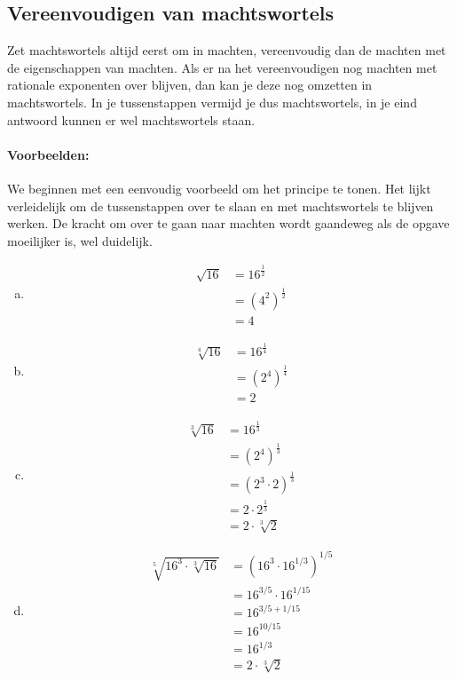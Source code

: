 \documentclass[12pt,twoside]{article}
\begin{document}
\subsection{Vereenvoudigen van machtswortels}

Zet machtswortels altijd eerst om in machten, vereenvoudig dan de machten met de eigenschappen van machten. Als er na het vereenvoudigen nog machten met rationale exponenten over blijven, dan kan je deze nog omzetten in machtswortels. In je tussenstappen vermijd je dus machtswortels, in je eind antwoord kunnen er wel machtswortels staan.

\paragraph*{Voorbeelden:} We beginnen met een eenvoudig voorbeeld om het principe te tonen. Het lijkt verleidelijk om de tussenstappen over te slaan en met machtswortels te blijven werken. De kracht om over te gaan naar machten wordt gaandeweg als de opgave moeilijker is, wel duidelijk.
\begin{enumerate}[(a)]
\item \mbox{}\vspace{-2em}
  \begin{align*}
    \sqrt {16} &= {16^{\frac{1}{2}}}\\
               &= \left(4^2\right)^{\frac{1}{2}}\\
               &= 4
  \end{align*}
\item \mbox{}\vspace{-2em}
  \begin{align*}
    \sqrt[4]{16} &= {16^{\frac{1}{4}}}\\
               &= \left(2^4\right)^{\frac{1}{4}}\\
               &= 2
  \end{align*}
\item \mbox{}\vspace{-2em}
  \begin{align*}
    \sqrt[3] {16} &= {16^{\frac{1}{3}}}\\
               &= \left(2^4\right)^{\frac{1}{3}}\\
               &= \left(2^3\cdot 2\right)^{\frac{1}{3}}\\
               &= 2 \cdot 2^{\frac{1}{3}}\\
               &= 2 \cdot \sqrt[3]{2}
  \end{align*}
\item \mbox{}\vspace{-2em}
  \begin{align*}
    \sqrt[5] {16^3\cdot\sqrt[3]{16}} &= \left(16^3\cdot 16^{1/3}\right)^{1/5}\\
               &= 16^{3/5}\cdot 16^{1/15}\\
               &= 16^{3/5+1/15}\\
               &= 16^{10/15}\\
               &= 16^{1/3}\\
               &= 2 \cdot \sqrt[3]{2}
  \end{align*}
\end{enumerate}
\end{document}
